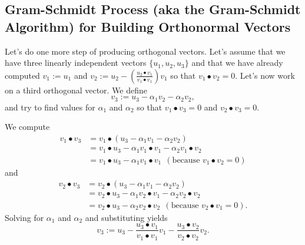 



\subsection{Gram-Schmidt Process (aka the Gram-Schmidt Algorithm) for Building Orthonormal Vectors}
\label{sec:gramSchmidt}

Let's do one more step of producing orthogonal vectors. Let's assume that we have three linearly independent vectors $\{u_1, u_2, u_3\}$ and that we have already computed $v_1:=u_1$ and $v_2:= u_2 -  \left(\frac{u_2 \bullet v_1}{v_1 \bullet v_1}\right) v_1$ so that $v_1 \bullet v_2 = 0$. Let's now work on a third orthogonal vector. We define 
$$v_3:= u_3 - \alpha_1 v_2 - \alpha_2 v_2, $$
and try to find values for $\alpha_1$ and $\alpha_2$ so that $v_1\bullet v_3 = 0$ and $v_2 \bullet v_3 = 0$.

We compute 
\begin{align*}
    v_1\bullet v_3 & = v_1\bullet (u_3 - \alpha_1 v_1 - \alpha_2 v_2) \\
    & =  v_1\bullet u_3 - \alpha_1  v_1\bullet v_1 - \alpha_2  v_1\bullet v_2 \\
    & =  v_1\bullet u_3 - \alpha_1  v_1\bullet v_1 ~~(\text{because } v_1\bullet v_2 = 0)
\end{align*}
and 
\begin{align*}
    v_2\bullet v_3 & =  v_2\bullet (u_3 - \alpha_1 v_1 - \alpha_2 v_2) \\
    & =  v_2\bullet u_3 - \alpha_1  v_2\bullet v_1 - \alpha_2  v_2\bullet v_2 \\
    & =  v_2\bullet u_3 - \alpha_2  v_2\bullet v_2 ~~(\text{because } v_2\bullet v_1 = 0).
\end{align*}
Solving for $\alpha_1$ and $\alpha_2$ and substituting yields
\begin{equation}
    v_3:= u_3 - \frac{u_3 \bullet v_1}{v_1 \bullet v_1} v_1 - \frac{u_3 \bullet v_2}{v_2 \bullet v_2} v_2. 
\end{equation}

